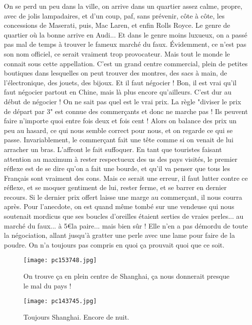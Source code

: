 \documentclass{book}
\begin{document}
On se perd un peu dans la ville, on arrive dans un quartier assez calme, propre, avec de jolis lampadaires, et d'un coup, paf, sans prévenir, côte à côte, les concessions de Maserati, puis, Mac Laren, et enfin Rolls Royce. Le genre de quartier où la bonne arrive en Audi... Et dans le genre moins luxueux, on a passé pas mal de temps à trouver le fameux marché du faux. Évidemment, ce n'est pas son nom officiel, ce serait vraiment trop provocateur. Mais tout le monde le connait sous cette appellation. C'est un grand centre commercial, plein de petites boutiques dans lesquelles on peut trouver des montres, des sacs à main, de l'électronique, des jouets, des bijoux. Et il faut négocier ! Bon, il est vrai qu'il faut négocier partout en Chine, mais là plus encore qu'ailleurs. C'est dur au début de négocier ! On ne sait pas quel est le vrai prix. La règle "diviser le prix de départ par 3" est connue des commerçants et donc ne marche pas ! Ils peuvent faire n'importe quoi entre fois deux et fois cent ! Alors on balance des prix un peu au hasard, ce qui nous semble correct pour nous, et on regarde ce qui se passe. Invariablement, le commerçant fait une tête comme si on venait de lui arracher un bras. L'affront le fait suffoquer. En tant que touristes faisant attention au maximum à rester respectueux des us des pays visités, le premier réflexe est de se dire qu'on a fait une bourde, et qu'il va penser que tous les Français sont vraiment des cons. Mais ce serait une erreur, il faut lutter contre ce réflexe, et se moquer gentiment de lui, rester ferme, et se barrer en dernier recours. Si le dernier prix offert laisse une marge au commerçant, il nous courra après. Pour l'anecdote, on est quand même tombé sur une vendeuse qui nous soutenait mordicus que ses boucles d'oreilles étaient serties de vraies perles... au marché du faux... à 5\euro la paire... mais bien sûr ! Elle n'en a pas démordu de toute la négociation, allant jusqu'à gratter une perle avec une lame pour faire de la poudre. On n'a toujours pas compris en quoi ça prouvait quoi que ce soit.


\begin{figure}[h]
\centering
\texttt{[image: pc153748.jpg]}
\caption*{On trouve ça en plein centre de Shanghai, ça nous donnerait presque le mal du pays !}
\end{figure}


\begin{figure}[h]
\centering
\texttt{[image: pc143745.jpg]}
\caption*{Toujours Shanghai. Encore de nuit.}
\end{figure}
\end{document}
